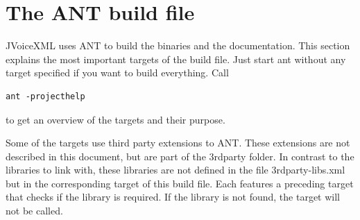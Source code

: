 \documentclass[11pt,a4paper]{article}
\begin{document}
\section{The ANT build file}
\label{sec:ant-build-file}

JVoiceXML uses ANT to build the binaries and the documentation. This section
explains the most important targets of the build file. Just start ant 
without any target specified if you want to build everything.
Call 
\begin{lstlisting}
ant -projecthelp
\end{lstlisting}
to get an overview of the targets and their purpose.

Some of the targets use third party extensions to ANT. These 
extensions are not described in this document, but are part of
the 3rdparty folder. In contrast to the libraries to link with,
these libraries are not defined in the file 3rdparty-libs.xml
but in the corresponding target of this build file. Each features
a preceding target that checks if the library is required. If
the library is not found, the target will not be called.
\end{document}
